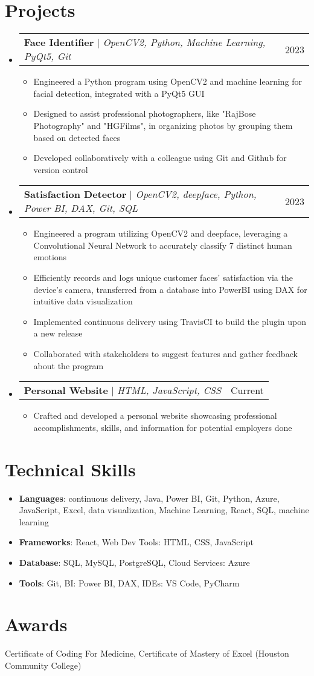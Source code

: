 \documentclass[letterpaper,11pt]{article}
\makeatletter
\newcommand{\resumeItem}[1]{
  \item\small{
    {#1 \vspace{-2pt}}
  }
}
\newcommand{\resumeProjectHeading}[2]{
    \item
    \begin{tabular*}{0.97\textwidth}{l@{\extracolsep{\fill}}r}
      \small#1 & #2 \\
    \end{tabular*}\vspace{-7pt}
}
\newcommand{\resumeSubHeadingListStart}{\begin{itemize}[leftmargin=0.15in, label={}]}
\newcommand{\resumeSubHeadingListEnd}{\end{itemize}}
\newcommand{\resumeItemListStart}{\begin{itemize}}
\newcommand{\resumeItemListEnd}{\end{itemize}\vspace{-5pt}}
\makeatother
\begin{document}
\section{Projects}
    \resumeSubHeadingListStart
      \resumeProjectHeading
          {\textbf{Face Identifier} $|$ \emph{OpenCV2, Python, Machine Learning, PyQt5, Git}}{2023}
          \resumeItemListStart
            \resumeItem{Engineered a Python program using OpenCV2 and machine learning for facial detection, integrated with a PyQt5 GUI}
            \resumeItem{Designed to assist professional photographers, like "RajBose Photography" and "HGFilms", in organizing photos by grouping them based on detected faces}
            \resumeItem{Developed collaboratively with a colleague using Git and Github for version control}
          \resumeItemListEnd
      \resumeProjectHeading
          {\textbf{Satisfaction Detector} $|$ \emph{OpenCV2, deepface, Python, Power BI, DAX, Git, SQL}}{2023}
          \resumeItemListStart
            \resumeItem{Engineered a program utilizing OpenCV2 and deepface, leveraging a Convolutional Neural Network to accurately classify 7 distinct human emotions}
            \resumeItem{Efficiently records and logs unique customer faces’ satisfaction via the device's camera, transferred from a database into PowerBI using DAX for intuitive data visualization}
            \resumeItem{Implemented continuous delivery using TravisCI to build the plugin upon a new release}
            \resumeItem{Collaborated with stakeholders to suggest features and gather feedback about the program}
          \resumeItemListEnd
        \resumeProjectHeading
    {\textbf{Personal Website} $|$ \emph{HTML, JavaScript, CSS}}{Current}
    \resumeItemListStart
        \resumeItem{Crafted and developed a personal website showcasing professional accomplishments, skills, and information for potential employers done}
    \resumeItemListEnd

    \resumeSubHeadingListEnd




%
\section{Technical Skills}
\begin{itemize}[leftmargin=0.15in, label={}]

        \item{\textbf{Languages}{: continuous delivery, Java, Power BI, Git, Python, Azure, JavaScript, Excel, data visualization, Machine Learning, React, SQL, machine learning }}
        \item{\textbf{Frameworks}{: React, Web Dev Tools: HTML, CSS, JavaScript}}
        \item{\textbf{Database}{: SQL, MySQL, PostgreSQL, Cloud Services: Azure}}
        \item{\textbf{Tools}{: Git, BI: Power BI, DAX, IDEs: VS Code, PyCharm}}

\end{itemize}
\section{Awards}
Certificate of Coding For Medicine, Certificate of Mastery of Excel (Houston Community College)





\end{document}
